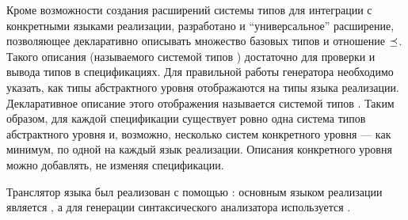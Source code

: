 Кроме возможности создания расширений системы типов для интеграции с конкретными языками реализации, разработано и ``универсальное'' расширение, позволяющее декларативно описывать множество базовых типов и отношение $\preceq_{}$. Такого описания (называемого системой типов ) достаточно для проверки и вывода типов в спецификациях. Для правильной работы генератора необходимо указать, как типы абстрактного уровня отображаются на типы языка реализации. Декларативное описание этого отображения называется системой типов .
Таким образом, для каждой спецификации существует ровно одна система типов абстрактного уровня и, возможно, несколько систем конкретного уровня --- как минимум, по одной на каждый язык реализации. Описания конкретного уровня можно добавлять, не изменяя спецификации.

Транслятор языка \GRM{} был реализован с помощью \ATF{}: основным языком реализации является , а для генерации синтаксического анализатора используется .

